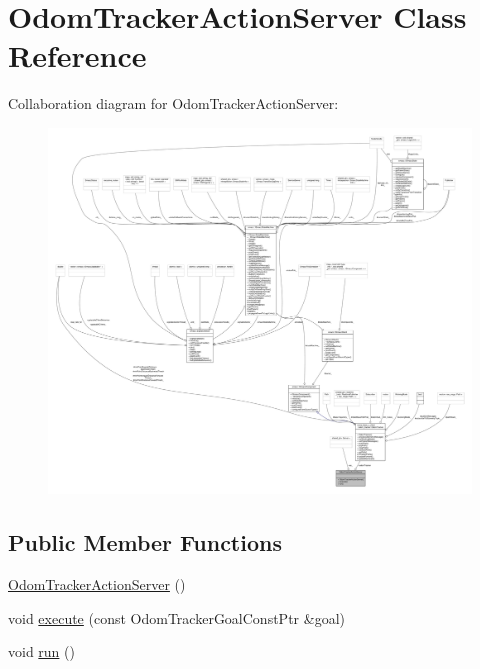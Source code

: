 \hypertarget{classOdomTrackerActionServer}{}\section{Odom\+Tracker\+Action\+Server Class Reference}
\label{classOdomTrackerActionServer}


Collaboration diagram for Odom\+Tracker\+Action\+Server\+:\nopagebreak
\begin{figure}[H]
\begin{center}
\leavevmode
\includegraphics[width=350pt]{classOdomTrackerActionServer__coll__graph}
\end{center}
\end{figure}
\subsection*{Public Member Functions}
\begin{DoxyCompactItemize}
\item 
\hyperlink{classOdomTrackerActionServer_a98b7fba6da04e1afcf1000f937be7fef}{Odom\+Tracker\+Action\+Server} ()
\item 
void \hyperlink{classOdomTrackerActionServer_afa69287377bb2a12c5346cbe8d68cb04}{execute} (const Odom\+Tracker\+Goal\+Const\+Ptr \&goal)
\item 
void \hyperlink{classOdomTrackerActionServer_a8ab6984c7383949a048d72437e9f79d3}{run} ()
\end{DoxyCompactItemize}
